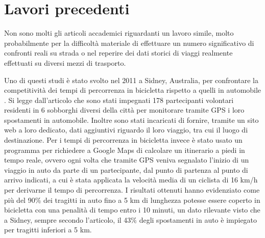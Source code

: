 \section{Lavori precedenti}
\label{lavoriprecedenti}

Non sono molti gli articoli accademici riguardanti un lavoro simile, molto probabilmente per la difficoltà materiale di effettuare un numero significativo di confronti reali su strada o nel reperire dei dati storici di viaggi realmente effettuati su diversi mezzi di trasporto.

Uno di questi studi è stato svolto nel 2011 a Sidney, Australia, per confrontare la competitività dei tempi di percorrenza in bicicletta rispetto a quelli in automobile \cite{ellison2011travel}. Si legge dall'articolo che sono stati impegnati 178 partecipanti volontari residenti in 6 sobborghi diversi della città per monitorare tramite GPS i loro spostamenti in automobile. Inoltre sono stati incaricati di fornire, tramite un sito web a loro dedicato, dati aggiuntivi riguardo il loro viaggio, tra cui il luogo di destinazione. Per i tempi di percorrenza in bicicletta invece è stato usato un programma per richiedere a Google Maps di calcolare un itinerario a piedi in tempo reale, ovvero ogni volta che tramite GPS veniva segnalato l'inizio di un viaggio in auto da parte di un partecipante, dal punto di partenza al punto di arrivo indicati, a cui è stata applicata la velocità media di un ciclista di 16 km/h per derivarne il tempo di percorrenza. I risultati ottenuti hanno evidenziato come più del 90\% dei tragitti in auto fino a 5 km di lunghezza potesse essere coperto in bicicletta con una penalità di tempo entro i 10 minuti, un dato rilevante visto che a Sidney, sempre secondo l'articolo, il 43\% degli spostamenti in auto è impiegato per tragitti inferiori a 5 km.

